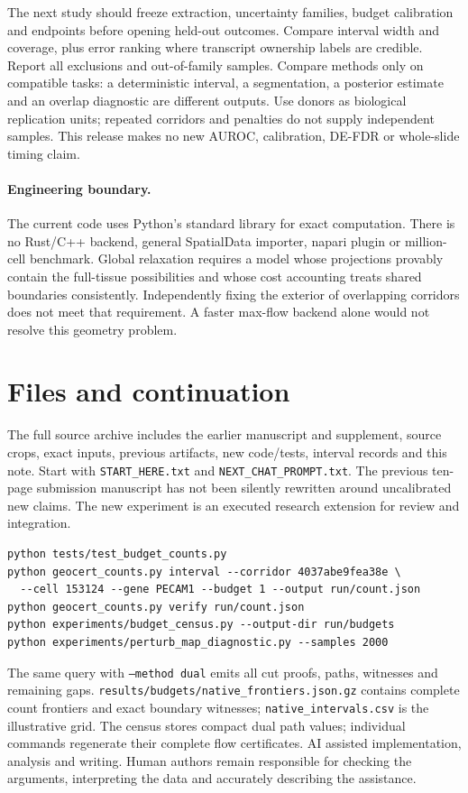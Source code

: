 \documentclass[11pt,letterpaper]{article}
\begin{document}
The next study should freeze extraction, uncertainty families, budget calibration and endpoints before opening held-out outcomes. Compare interval width and coverage, plus error ranking where transcript ownership labels are credible. Report all exclusions and out-of-family samples. Compare methods only on compatible tasks: a deterministic interval, a segmentation, a posterior estimate and an overlap diagnostic are different outputs. Use donors as biological replication units; repeated corridors and penalties do not supply independent samples. This release makes no new AUROC, calibration, DE-FDR or whole-slide timing claim.

\paragraph{Engineering boundary.}
The current code uses Python's standard library for exact computation. There is no Rust/C++ backend, general SpatialData importer, napari plugin or million-cell benchmark. Global relaxation requires a model whose projections provably contain the full-tissue possibilities and whose cost accounting treats shared boundaries consistently. Independently fixing the exterior of overlapping corridors does not meet that requirement. A faster max-flow backend alone would not resolve this geometry problem.

\section{Files and continuation}
The full source archive includes the earlier manuscript and supplement, source crops, exact inputs, previous artifacts, new code/tests, interval records and this note. Start with \texttt{START\_HERE.txt} and \texttt{NEXT\_CHAT\_PROMPT.txt}. The previous ten-page submission manuscript has not been silently rewritten around uncalibrated new claims. The new experiment is an executed research extension for review and integration.
\begin{verbatim}
python tests/test_budget_counts.py
python geocert_counts.py interval --corridor 4037abe9fea38e \
  --cell 153124 --gene PECAM1 --budget 1 --output run/count.json
python geocert_counts.py verify run/count.json
python experiments/budget_census.py --output-dir run/budgets
python experiments/perturb_map_diagnostic.py --samples 2000
\end{verbatim}
The same query with \texttt{--method dual} emits all cut proofs, paths, witnesses and remaining gaps. \texttt{results/budgets/native\_frontiers.json.gz} contains complete count frontiers and exact boundary witnesses; \texttt{native\_intervals.csv} is the illustrative grid. The census stores compact dual path values; individual commands regenerate their complete flow certificates. AI assisted implementation, analysis and writing. Human authors remain responsible for checking the arguments, interpreting the data and accurately describing the assistance.
\end{document}
